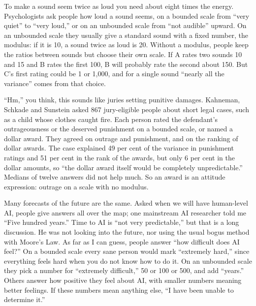 
To make a sound seem twice as loud you need about eight times the energy. Psychologists ask people how loud a sound seems, on a bounded scale from ``very quiet'' to ``very loud,'' or on an unbounded scale from ``not audible'' upward. On an unbounded scale they usually give a standard sound with a fixed number, the modulus: if it is 10, a sound twice as loud is 20. Without a modulus, people keep the ratios between sounds but choose their own scale. If A rates two sounds 10 and 15 and B rates the first 100, B will probably rate the second about 150. But C's first rating could be 1 or 1,000, and for a single sound ``nearly all the variance'' comes from that choice.

``Hm,'' you think, this sounds like juries setting punitive damages.  Kahneman, Schkade and Sunstein asked 867 jury-eligible people about short legal cases, such as a child whose clothes caught fire. Each person rated the defendant's outrageousness or the deserved punishment on a bounded scale, or named a dollar award. They agreed on outrage and punishment, and on the ranking of dollar awards. The case explained 49 per cent of the variance in punishment ratings and 51 per cent in the rank of the awards, but only 6 per cent in the dollar amounts, so ``the dollar award itself would be completely unpredictable.''  Medians of twelve answers did not help much. So an award is an attitude expression: outrage on a scale with no modulus. 

Many forecasts of the future are the same. Asked when we will have human-level AI, people give answers all over the map; one mainstream AI researcher told me ``Five hundred years.'' Time to AI is ``not very predictable,'' but that is a long discussion.  He was not looking into the future, nor using the usual bogus method with Moore's Law. As far as I can guess, people answer ``how difficult does AI feel?'' On a bounded scale every sane person would mark ``extremely hard,'' since everything feels hard when you do not know how to do it. On an unbounded scale they pick a number for ``extremely difficult,'' 50 or 100 or 500, and add ``years.'' Others answer how positive they feel about AI, with smaller numbers meaning better feelings. If these numbers mean anything else, ``I have been unable to determine it.'' 

